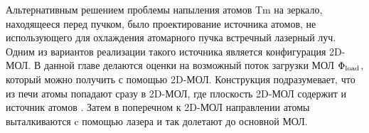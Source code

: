 

Альтернативным решением проблемы напыления атомов Tm на зеркало, находящееся перед пучком,  было проектирование источника атомов, не использующего для охлаждения атомарного пучка встречный лазерный луч. Одним из вариантов реализации такого источника является конфигурация 2D-МОЛ. В данной главе делаются оценки на возможный поток загрузки МОЛ $\Phi_{\textnormal{load}}$, который можно получить с помощью 2D-МОЛ. Конструкция подразумевает, что из печи атомы попадают сразу в 2D-МОЛ, где плоскость 2D-МОЛ содержит и источник атомов . Затем в поперечном к 2D-МОЛ направлении атомы выталкиваются c помощью лазера и так долетают до основной МОЛ. 